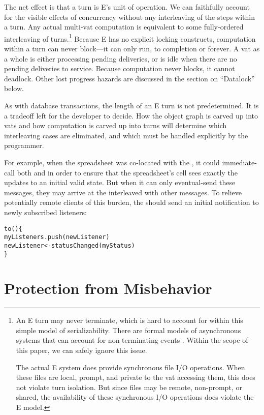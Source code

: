 \documentclass{llncs}
\begin{document}
The net effect is that a turn is E's unit of operation. We can
faithfully account for the visible effects of concurrency without any
interleaving of the steps within a turn. Any actual multi-vat
computation is equivalent to some fully-ordered interleaving of
turns.\footnote{
%
An E turn may never terminate, which is hard to account for within
this simple model of serializability. There are formal models of
asynchronous systems that can account for non-terminating events
\cite{chandy:snapshots}. Within the scope of this paper, we can safely
ignore this issue.

The actual E system does provide synchronous file I/O operations. When
these files are local, prompt, and private to the vat accessing them,
this does not violate turn isolation. But since files may be remote,
non-prompt, or shared, the availability of these synchronous I/O
operations does violate the E model.}
%
Because E has no explicit locking constructs, computation within a
turn can never block---it can only run, to completion or forever. A
vat as a whole is either processing pending deliveries, or is idle
when there are no pending deliveries to service. Because computation
never blocks, it cannot deadlock.  Other lost progress hazards are
discussed in the section on ``Datalock'' below.

As with database transactions, the length of an E turn is not
predetermined. It is a tradeoff left for the developer to decide. How
the object graph is carved up into vats and how computation is carved
up into turns will determine which interleaving cases are eliminated,
and which must be handled explicitly by the programmer. 

For example, when the spreadsheet was co-located with the
, it could immediate-call both  and
 in order to ensure that the spreadsheet's cell sees
exactly the updates to an initial valid state. But when it can only
eventual-send these messages, they may arrive at the
 interleaved with other messages. To relieve
potentially remote clients of this burden, the 
should send an initial notification to newly subscribed listeners:
%
\begin{alltt}
    to () \{
        myListeners.push(newListener)
        newListener <- statusChanged(myStatus)
    \}
\end{alltt}
%

\section{Protection from Misbehavior}
\end{document}
